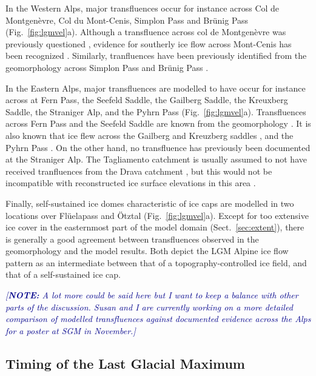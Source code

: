 \documentclass[tc, manuscript]{copernicus}
\newcommand{\note}[1]{\textcolor{darkblue}{\emph{[\textbf{NOTE:} #1]}}}
\begin{document}
    In the Western Alps, major transfluences occur for instance across Col de
    Montgenèvre, Col du Mont-Cenis, Simplon Pass and Brünig Pass
    (Fig.~\ref{fig:lgmvel}a). Although a transfluence across col de Montgenèvre
    was previously questioned \citep[Fig.~2]{Cossart.etal.2012}, evidence for
    southerly ice flow across Mont-Cenis has been recognized
    \citep[Fig.~3.18, p.~284]{Onde.1938, Coutterand.2010}. Similarly,
    tranfluences have been previously identified from the geomorphology across
    Simplon Pass \citep{Kelly.etal.2004} and Brünig Pass \citep{Jackli.1962}.

    In the Eastern Alps, major transfluences are modelled to have occur for
    instance across at Fern Pass, the Seefeld Saddle, the Gailberg Saddle, the
    Kreuxberg Saddle, the Straniger Alp, and the Pyhrn Pass
    (Fig.~\ref{fig:lgmvel}a). Transfluences across Fern Pass and the Seefeld
    Saddle are known from the geomorphology
    \citep[Fig.~2.4]{Penck.Bruckner.1909, Husen.2011}. It is also known that
    ice flew across the Gailberg and Kreuzberg saddles \citep{Husen.1985}, and
    the Pyhrn Pass \citep[Fig.~\ref{fig:lgmvel}a; cf.][Fig.~2.5]{Husen.2011}.
    On the other hand, no transfluence has previously been documented at the
    Straniger Alp. The Tagliamento catchment is usually assumed to not have
    received tranfluences from the Drava catchment \citep{Monegato.etal.2007},
    but this would not be incompatible with reconstructed ice surface
    elevations in this area \citep{Husen.1987}.

    Finally, self-sustained ice domes characteristic of ice caps are modelled
    in two locations over Flüelapass and Ötztal (Fig.~\ref{fig:lgmvel}a).
    Except for too extensive ice cover in the easternmost part of the model
    domain (Sect.~\ref{sec:extent}), there is generally a good agreement
    between transfluences observed in the geomorphology and the model results.
    Both depict the LGM Alpine ice flow pattern as an intermediate between that
    of a topography-controlled ice field, and that of a self-sustained ice cap.

    \note{A lot more could be said here but I want to keep a balance with
          other parts of the discussion. Susan and I are currently working on a
          more detailed comparison of modelled transfluences against documented
          evidence across the Alps for a poster at SGM in November.}


\subsection{Timing of the Last Glacial Maximum}
\label{sec:timing}
\end{document}
